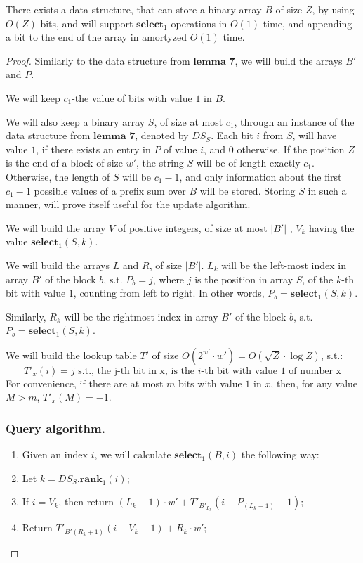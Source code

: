 \documentclass[runningheads]{llncs}
\begin{document}
\begin{lemma}
    There exists a data structure, that can store a binary array $B$ of size $Z$, by using $O(Z)$ bits, and will support $\textbf{select}_1$ operations in $O(1)$ time,
    and appending a bit to the end of the array in amortyzed $O(1)$ time.
\end{lemma}
\begin{proof}


    Similarly to the data structure from $\textbf{lemma 7}$, we will build the arrays $B'$ and $P$.
    
    We will keep $c_1$-the value of bits with value $1$ in $B$.
    
    We will also keep a binary array $S$, of size at most $c_1$, through an instance of the data structure from $\textbf{lemma 7}$, denoted by $DS_S$.
    Each bit $i$ from $S$, will have value $1$, if there exists an entry in $P$ of value $i$, and $0$ otherwise.
    If the position $Z$ is the end of a block of size $w'$, the string $S$ will be of length exactly $c_1$. Otherwise, the length of $S$ will be $c_1-1$, 
    and only information about the first $c_1-1$ possible values of a prefix sum over $B$ will be stored. 
    Storing $S$ in such a manner, will prove itself useful for the update algorithm.

    We will build the array $V$ of positive integers, of size at most $|B'|$ , 
    $V_k$ having the value $\textbf{select}_1(S, k)$.

    We will build the arrays $L$ and $R$, of size $|B'|$. $L_k$ will be the left-most index in array $B'$ of the block $b$, s.t. 
    $P_b=j$, where $j$ is the position in array $S$, of the $k$-th bit with value $1$, counting from left to right.
    In other words, $P_b=\textbf{select}_1(S, k)$.
    
    Similarly, $R_k$ will be the rightmost index in array $B'$ of the block $b$, s.t. 
    $P_b=\textbf{select}_1(S, k)$.
    
    We will build the lookup table $T'$ of size $O(2^{w'}\cdot w') =O(\sqrt{Z}\cdot \log Z)$, s.t.:
    \[
       T'_x(i) = j \text{ s.t., the j-th bit in x, is the  }i\text{-th bit with value 1 of number x}
    \]
    For convenience, if there are at most $m$ bits with value $1$ in $x$, then, for any value $M>m$, $T'_x(M)=-1$.
    \subsubsection{Query algorithm.}
    \begin{enumerate}
        \item[] Given an index $i$, we will calculate $\textbf{select}_1(B, i)$ the following way:
        \item Let $k=DS_{S}.\textbf{rank}_1(i)$;
        \item If $i=V_k$, then return $(L_k-1)\cdot w' + T'_{B'_{L_k}}( i - P_{(L_k-1)} - 1 )$;
        \item Return $T'_{B'(R_k+1)}(i-V_k-1)+R_k\cdot w'$;
    \end{enumerate}


\end{proof}
\end{document}
